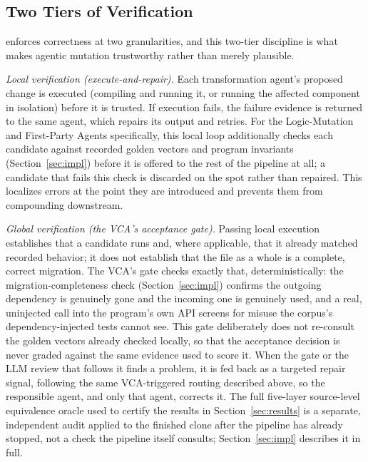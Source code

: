 \subsection{Two Tiers of Verification}

\sys enforces correctness at two granularities, and this two-tier discipline is what makes agentic mutation trustworthy rather than merely plausible.

\emph{Local verification (execute-and-repair).} Each transformation agent's proposed change is executed (compiling and running it, or running the affected component in isolation) before it is trusted. If execution fails, the failure evidence is returned to the same agent, which repairs its output and retries. For the Logic-Mutation and First-Party Agents specifically, this local loop additionally checks each candidate against recorded golden vectors and program invariants (Section~\ref{sec:impl}) before it is offered to the rest of the pipeline at all; a candidate that fails this check is discarded on the spot rather than repaired. This localizes errors at the point they are introduced and prevents them from compounding downstream.

\emph{Global verification (the VCA's acceptance gate).} Passing local execution establishes that a candidate runs and, where applicable, that it already matched recorded behavior; it does not establish that the file as a whole is a complete, correct migration. The VCA's gate checks exactly that, deterministically: the migration-completeness check (Section~\ref{sec:impl}) confirms the outgoing dependency is genuinely gone and the incoming one is genuinely used, and a real, uninjected call into the program's own API screens for misuse the corpus's dependency-injected tests cannot see. This gate deliberately does not re-consult the golden vectors already checked locally, so that the acceptance decision is never graded against the same evidence used to score it. When the gate or the LLM review that follows it finds a problem, it is fed back as a targeted repair signal, following the same VCA-triggered routing described above, so the responsible agent, and only that agent, corrects it. The full five-layer source-level equivalence oracle used to certify the results in Section~\ref{sec:results} is a separate, independent audit applied to the finished clone after the pipeline has already stopped, not a check the pipeline itself consults; Section~\ref{sec:impl} describes it in full.
